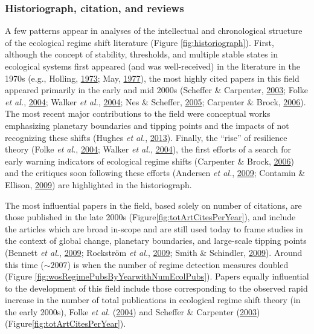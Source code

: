 \documentclass[print]{nuthesis}
\begin{document}
\hypertarget{historiograph-citation-and-reviews}{%
\subsubsection{Historiograph, citation, and reviews}\label{historiograph-citation-and-reviews}}

A few patterns appear in analyses of the intellectual and chronological structure of the ecological regime shift literature (Figure \ref{fig:historiograph}). First, although the concept of stability, thresholds, and multiple stable states in ecological systems first appeared (and was well-received) in the literature in the 1970s (e.g., Holling, \protect\hyperlink{ref-holling1973resilience}{1973}; May, \protect\hyperlink{ref-may1977thresholds}{1977}), the most highly cited papers in this field appeared primarily in the early and mid 2000s (Scheffer \& Carpenter, \protect\hyperlink{ref-scheffer2003catastrophic}{2003}; Folke \emph{et al.}, \protect\hyperlink{ref-folke2004regime}{2004}; Walker \emph{et al.}, \protect\hyperlink{ref-walker2004resilience}{2004}; Nes \& Scheffer, \protect\hyperlink{ref-van2005implications}{2005}; Carpenter \& Brock, \protect\hyperlink{ref-carpenter2006rising}{2006}). The most recent major contributions to the field were conceptual works emphasizing planetary boundaries and tipping points and the impacts of not recognizing these shifts (Hughes \emph{et al.}, \protect\hyperlink{ref-hughes2013multiscale}{2013}). Finally, the ``rise'' of resilience theory (Folke \emph{et al.}, \protect\hyperlink{ref-folke2004regime}{2004}; Walker \emph{et al.}, \protect\hyperlink{ref-walker2004resilience}{2004}), the first efforts of a search for early warning indicators of ecological regime shifts (Carpenter \& Brock, \protect\hyperlink{ref-carpenter2006rising}{2006}) and the critiques soon following these efforts (Andersen \emph{et al.}, \protect\hyperlink{ref-andersen_ecological_2009}{2009}; Contamin \& Ellison, \protect\hyperlink{ref-contamin_indicators_2009}{2009}) are highlighted in the historiograph.

The most influential papers in the field, based solely on number of citations, are those published in the late 2000s (Figure\ref{fig:totArtCitesPerYear}), and include the articles which are broad in-scope and are still used today to frame studies in the context of global change, planetary boundaries, and large-scale tipping points (Bennett \emph{et al.}, \protect\hyperlink{ref-bennett2009understanding}{2009}; Rockström \emph{et al.}, \protect\hyperlink{ref-rockstrom_planetary_2009}{2009}; Smith \& Schindler, \protect\hyperlink{ref-smith2009eutrophication}{2009}). Around this time (\(\sim2007\)) is when the number of regime detection measures doubled (Figure \ref{fig:wosRegimePubsByYearwithNumEcolPubs}). Papers equally influential to the development of this field include those corresponding to the observed rapid increase in the number of total publications in ecological regime shift theory (in the early 2000s), Folke \emph{et al.} (\protect\hyperlink{ref-folke2004regime}{2004}) and Scheffer \& Carpenter (\protect\hyperlink{ref-scheffer2003catastrophic}{2003}) (Figure\ref{fig:totArtCitesPerYear}).
\end{document}
